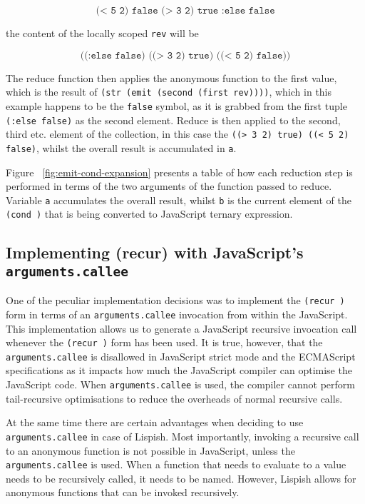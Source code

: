 $$ \texttt{(< 5 2) false (> 3 2) true :else false} $$

the content of the locally scoped \texttt{rev} will be 

$$ \texttt{((:else false) ((> 3 2) true) ((< 5 2) false))} $$

The reduce function then applies the anonymous function to the first value, which is the result of \texttt{(str (emit (second (first rev))))}, which in this example happens to be the \texttt{false} symbol, as it is grabbed from the first tuple \texttt{(:else false)} as the second element. Reduce is then applied to the second, third etc. element of the collection, in this case the \texttt{((> 3 2) true) ((< 5 2) false)}, whilst the overall result is accumulated in \texttt{a}.



Figure ~\ref{fig:emit-cond-expansion} presents a table of how each reduction step is performed in terms of the two arguments of the function passed to reduce. Variable \texttt{a} accumulates the overall result, whilst \texttt{b} is the current element of the \texttt{(cond )} that is being converted to JavaScript ternary expression.

\subsection{Implementing (recur) with JavaScript's \texttt{arguments.callee}}\label{arguments.callee}
One of the peculiar implementation decisions was to implement the \texttt{(recur )} form in terms of an \texttt{arguments.callee} invocation from within the JavaScript. 
This implementation allows us to generate a JavaScript recursive invocation call whenever the \texttt{(recur )} form has been used. 
It is true, however, that the \texttt{arguments.callee} is disallowed in JavaScript strict mode and the ECMAScript specifications as it impacts how much the JavaScript compiler can optimise the JavaScript code. When \texttt{arguments.callee} is used, the compiler cannot perform tail-recursive optimisations to reduce the overheads of normal recursive calls.  

At the same time there are certain advantages when deciding to use \texttt{arguments.callee} in case of Lispish. 
Most importantly, invoking a recursive call to an anonymous function is not possible in JavaScript, unless the \texttt{arguments.callee} is used. When a function that needs to evaluate to a value needs to be recursively called, it needs to be named. However, Lispish allows for anonymous functions that can be invoked recursively.

